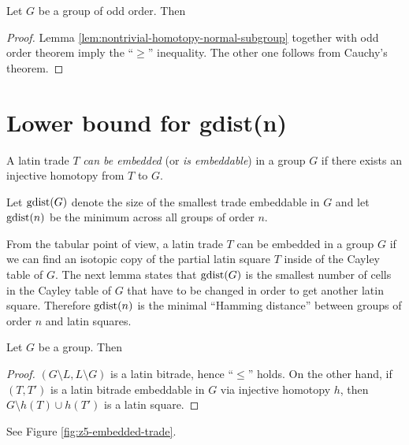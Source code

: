 \begin{lem}
\label{lem:zG-is-zp}
Let $G$ be a group of odd order. Then
%
\end{lem}
\begin{proof}
Lemma \ref{lem:nontrivial-homotopy-normal-subgroup} together with odd order theorem imply the ``$\geq$'' inequality. The other one follows from Cauchy's theorem.
\end{proof}

\section{Lower bound for gdist(n)}

\begin{defn}
A latin trade $T$ \emph{can be embedded} (or \emph{is embeddable}) in a group $G$ if there exists an injective homotopy from $T$ to $G$.

Let \emph{$\mathop{\mathrm{gdist}}(G)$} denote the size of the smallest trade embeddable in $G$ and let \emph{$\mathop{\mathrm{gdist}}(n)$} be the minimum across all groups of order $n$.
\end{defn}

From the tabular point of view, a latin trade $T$ can be embedded in a group $G$ if we can find an isotopic copy of the partial latin square $T$ inside of the Cayley table of $G$. The next lemma states that $\mathop{\mathrm{gdist}}(G)$ is the smallest number of cells in the Cayley table of $G$ that have to be changed in order to get another latin square. Therefore $\mathop{\mathrm{gdist}}(n)$ is the minimal ``Hamming distance'' between groups of order $n$ and latin squares.

\begin{lem}
Let $G$ be a group. Then
%
\end{lem}
\begin{proof}
$(G \setminus L, L \setminus G)$ is a latin bitrade, hence ``$\leq$'' holds. On the other hand, if $(T,T')$ is a latin bitrade embeddable in $G$ via injective homotopy $h$, then $G \setminus h(T) \cup h(T')$ is a latin square.
\end{proof}

\begin{exmp}
See Figure \ref{fig:z5-embedded-trade}.
\end{exmp}%

